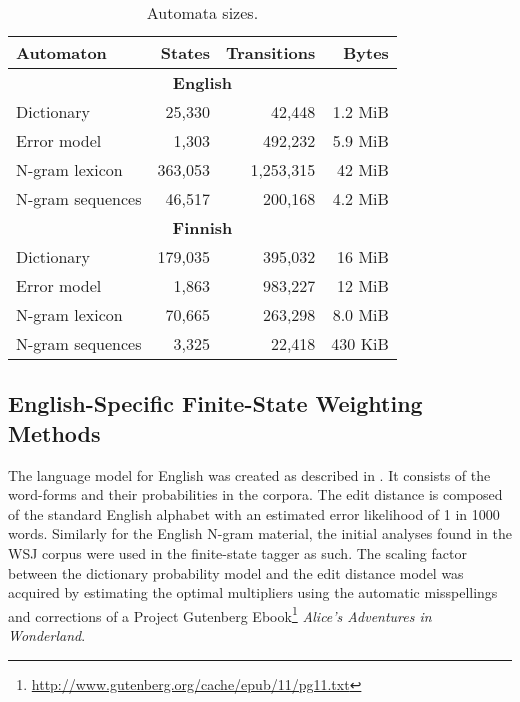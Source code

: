 \documentclass{llncs}
\begin{document}
\begin{table}
\caption{Automata sizes\label{table:sizes}.}
\begin{center}
\begin{tabular}{lrrr}
    Automaton & States & Transitions & Bytes \\
    \hline
    \multicolumn{4}{c}{\textbf{English}} \\
    \hline
    Dictionary & 25,330 & 42,448 & 1.2 MiB \\
    Error model & 1,303 & 492,232 & 5.9 MiB \\
    N-gram lexicon & 363,053 & 1,253,315 & 42 MiB \\
    N-gram sequences & 46,517 & 200,168 & 4.2 MiB \\
    \hline
    \multicolumn{4}{c}{\textbf{Finnish}} \\
    \hline
    Dictionary & 179,035 & 395,032 & 16 MiB \\
    Error model & 1,863 & 983,227 & 12 MiB \\
    N-gram lexicon & 70,665 & 263,298 & 8.0 MiB \\
    N-gram sequences & 3,325 & 22,418 & 430 KiB \\
    \hline
\end{tabular}
\end{center}
\end{table}

\subsection{English-Specific Finite-State Weighting Methods}

The language model for English was created as described in
\cite{norvig/2010}.
  It consists of the word-forms and their  probabilities in the
corpora. The edit distance is composed of the standard English alphabet with
an estimated error likelihood of 1 in 1000 words.  Similarly for the English N-gram
material, the initial analyses found in the WSJ corpus were used in the
finite-state tagger as such. The scaling factor between the dictionary probability model and
the edit distance model was acquired by estimating the optimal multipliers using the automatic
misspellings and corrections of a Project Gutenberg Ebook\footnote{\url{http://www.gutenberg.org/cache/epub/11/pg11.txt}} \emph{Alice's Adventures in Wonderland}.
\end{document}
